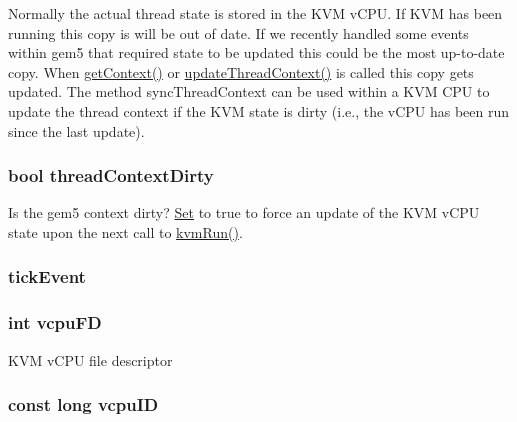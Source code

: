 Normally the actual thread state is stored in the KVM vCPU. If KVM has been running this copy is will be out of date. If we recently handled some events within gem5 that required state to be updated this could be the most up-\/to-\/date copy. When \hyperlink{classBaseKvmCPU_a2199ea70043ddde97c86e49a656b7ba9}{getContext()} or \hyperlink{classBaseKvmCPU_ac47bfb587580ca76050e0c9bc753c10d}{updateThreadContext()} is called this copy gets updated. The method syncThreadContext can be used within a KVM CPU to update the thread context if the KVM state is dirty (i.e., the vCPU has been run since the last update). \hypertarget{classBaseKvmCPU_a8d712456c8dd8a9842aa40a69dbc27dd}{
\subsubsection[{threadContextDirty}]{\setlength{\rightskip}{0pt plus 5cm}bool {\bf threadContextDirty}}}
\label{classBaseKvmCPU_a8d712456c8dd8a9842aa40a69dbc27dd}
Is the gem5 context dirty? \hyperlink{classSet}{Set} to true to force an update of the KVM vCPU state upon the next call to \hyperlink{classBaseKvmCPU_aed3dbd0c0bf26d82ee56367a3f350506}{kvmRun()}. \hypertarget{classBaseKvmCPU_aa36b8e894416f0ec98f701ab08f2ac22}{
\subsubsection[{tickEvent}]{ {\bf tickEvent}}}
\label{classBaseKvmCPU_aa36b8e894416f0ec98f701ab08f2ac22}
\hypertarget{classBaseKvmCPU_a6b91f8b5649b80e8424cebfa3047e1d0}{
\subsubsection[{vcpuFD}]{\setlength{\rightskip}{0pt plus 5cm}int {\bf vcpuFD}}}
\label{classBaseKvmCPU_a6b91f8b5649b80e8424cebfa3047e1d0}
KVM vCPU file descriptor \hypertarget{classBaseKvmCPU_ac52bdf6886dcfd53068633de9ed83184}{
\subsubsection[{vcpuID}]{\setlength{\rightskip}{0pt plus 5cm}const long {\bf vcpuID}}}
